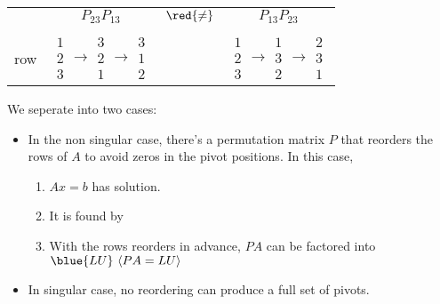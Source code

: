 \begin{center}
    \begin{tabular}{|cccc|}
         & $P_{23}P_{13}$ & $\red{\neq}$ & $P_{13}P_{23}$ \\
         &&& \\
        row & $\begin{matrix}
            1 \\ 2 \\ 3
        \end{matrix} \rightarrow \begin{matrix}
            3 \\ 2 \\ 1
        \end{matrix} \rightarrow \begin{matrix}
            3 \\ 1 \\ 2
        \end{matrix}$ & & $\begin{matrix}
            1 \\ 2 \\ 3
        \end{matrix} \rightarrow \begin{matrix}
            1 \\ 3 \\ 2
        \end{matrix} \rightarrow \begin{matrix}
            2 \\ 3 \\ 1
        \end{matrix}$
    \end{tabular}
\end{center}

\newpage

\begin{theorem}
    We seperate into two cases:
    \begin{itemize}
        \item In the non singular case, there's a permutation matrix $P$ that reorders the rows of $A$ to avoid zeros in the pivot positions.
        In this case, 
        \begin{enumerate}[label=(\arabic*)]
            \item $Ax=b$ has  solution.
            \item It is found by 
            \item With the rows reorders in advance, $PA$ can be factored into $\blue{LU} \ \langle PA=LU \rangle$
        \end{enumerate}
        \item In singular case, no reordering can produce a full set of pivots.
    \end{itemize}
\end{theorem}

